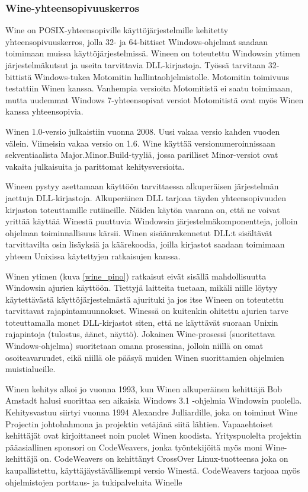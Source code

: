 \subsubsection{Wine-yhteensopivuuskerros}
Wine on POSIX-yhteensopiville käyttöjärjestelmille kehitetty yhteensopivuuskerros, jolla 32- ja 64-bittiset Windows-ohjelmat saadaan toimimaan muissa käyttöjärjestelmissä. Wineen on toteutettu Windowsin ytimen järjestelmäkutsut ja useita tarvittavia DLL-kirjastoja. Työssä tarvitaan 32-bittistä Windows-tukea Motomitin hallintaohjelmistolle. Motomitin toimivuus testattiin Winen kanssa. Vanhempia versioita Motomitistä ei saatu toimimaan, mutta uudemmat Windows 7-yhteensopivat versiot Motomitistä ovat myös Winen kanssa yhteensopivia.

Winen 1.0-versio julkaistiin vuonna 2008. Uusi vakaa versio kahden vuoden välein. Viimeisin vakaa versio on 1.6. Wine käyttää versionumeroinnissaan sekventiaalista Major.Minor.Build-tyyliä, jossa parilliset Minor-versiot ovat vakaita julkaisuita ja parittomat kehitysversioita.

Wineen pystyy asettamaan käyttöön tarvittaessa alkuperäisen järjestelmän jaettuja DLL-kirjastoja. Alkuperäinen DLL tarjoaa täyden yhteensopivuuden kirjaston toteuttamille rutiineille. Näiden käytön vaarana on, että ne voivat yrittää käyttää Winestä puuttuvia Windowsin järjestelmäkomponentteja, jolloin ohjelman toiminnallisuus kärsii. Winen sisäänrakennetut DLL:t sisältävät tarvittavilta osin lisäyksiä ja käärekoodia, joilla kirjastot saadaan toimimaan yhteem Unixissa käytettyjen ratkaisujen kanssa.

Winen ytimen (kuva \ref{wine_pino}) ratkaisut eivät sisällä mahdollisuutta Windowsin ajurien käyttöön. Tiettyjä laitteita tuetaan, mikäli niille löytyy käytettävästä käyttöjärjestelmästä ajurituki ja jos itse Wineen on toteutettu tarvittavat rajapintamuunnokset. Winessä on kuitenkin ohitettu ajurien tarve toteuttamalla monet DLL-kirjastot siten, että ne käyttävät suoraan Unixin rajapintoja (tulostus, äänet, näyttö). Jokainen Wine-prosessi (suoritettava Windows-ohjelma) suoritetaan omana prosessina, jolloin niillä on omat osoiteavaruudet, eikä niillä ole pääsyä muiden Winen suorittamien ohjelmien muistialueille.

Winen kehitys alkoi jo vuonna 1993, kun Winen alkuperäinen kehittäjä Bob Amstadt halusi suorittaa sen aikaisia Windows 3.1 -ohjelmia Windowsin puolella. Kehitysvastuu siirtyi vuonna 1994 Alexandre Julliardille, joka on toiminut Wine Projectin johtohahmona ja projektin vetäjänä siitä lähtien. Vapaaehtoiset kehittäjät ovat kirjoittaneet noin puolet Winen koodista. Yrityspuolelta projektin pääasiallinen sponsori on CodeWeavers, jonka työntekijöitä myös moni Wine-kehittäjä on. CodeWeavers on kehittänyt CrossOver Linux-tuotteensa joka on kaupallistettu, käyttäjäystävällisempi versio Winestä. CodeWeavers tarjoaa myös ohjelmistojen porttaus- ja tukipalveluita Winelle \citep{wine:codeweavers}


